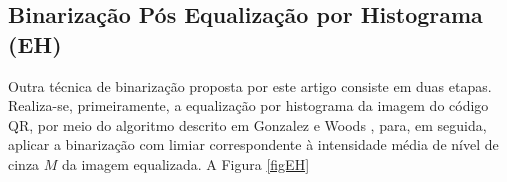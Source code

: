 \documentclass{ceel}
\begin{document}
\begin{multicols}{2}
\subsection{Binarização Pós Equalização por Histograma (EH)} \label{Bhist}
Outra técnica de binarização proposta por este artigo consiste em duas etapas. Realiza-se, primeiramente, a equalização por histograma da imagem do código QR, por meio do algoritmo descrito em Gonzalez e Woods \cite{gonzales}, para, em seguida, aplicar a binarização com limiar correspondente à intensidade
média de nível de cinza  $M$ da imagem equalizada. A Figura \ref{figEH} 
\columnbreak

\hspace{-0.43cm}
\begin{minipage}[h]{\columnwidth}
\captionsetup{type=figure}
 \hfill
{}\\
\hfill
{}\\

\end{minipage}
\end{multicols}
\end{document}
